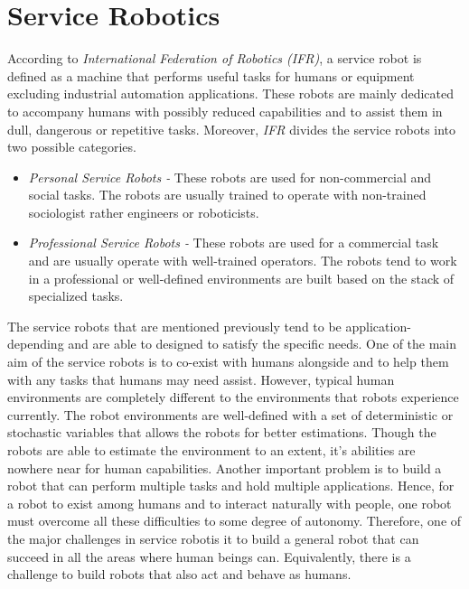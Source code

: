 \section{Service Robotics}

According to \textit{International Federation of Robotics (IFR)}, a service robot is defined as a machine that performs useful
tasks for humans or equipment excluding industrial automation applications. These robots are mainly dedicated to accompany humans
with possibly reduced capabilities and to assist them in dull, dangerous or repetitive tasks. Moreover, \textit{IFR} divides the 
service robots into two possible categories.

\begin{itemize}
    \item \textit{Personal Service Robots -} These robots are used for non-commercial and social tasks. The robots are usually trained 
    to operate with non-trained sociologist rather engineers or roboticists.
    \item \textit{Professional Service Robots -} These robots are used for a commercial task and are usually operate with well-trained
    operators. The robots tend to work in a professional or well-defined environments are built based on the stack of specialized tasks.

\end{itemize}

The service robots that are mentioned previously tend to be application-depending and are able to designed to satisfy the specific needs. 
One of the main aim of the service robots is to co-exist with humans alongside and to help them with any tasks that humans may need assist.
However, typical human environments are completely different to the environments that robots experience currently. The robot environments are 
well-defined with a set of deterministic or stochastic variables that allows the robots for better estimations. Though the robots are able to 
estimate the environment to an extent, it's abilities are nowhere near for human capabilities. Another important problem is to build a robot 
that can perform multiple tasks and hold multiple applications. Hence, for a robot to exist among humans and to interact naturally with people, 
one robot must overcome all these difficulties to some degree of autonomy. Therefore, one of the major challenges in service robotis it to build a 
general robot that can succeed in all the areas where human beings can. Equivalently, there is a challenge to build robots that also act and behave
as humans.


